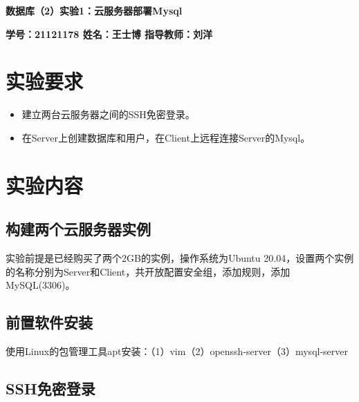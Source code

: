 \documentclass{article}
\begin{document}
 \pingfang
\begin{center}
    \textbf{\huge 数据库（2）实验1：云服务器部署Mysql}
\end{center}
\begin{center}
    \textbf{\large \textbf{学号：21121178 \quad 姓名：王士博 \quad 指导教师：刘洋}}
\end{center}
\hrulefill
\section{实验要求}
\begin{itemize}
  \item 建立两台云服务器之间的SSH免密登录。
  \item 在Server上创建数据库和用户，在Client上远程连接Server的Mysql。
\end{itemize}
\section{实验内容}
\subsection{构建两个云服务器实例}
实验前提是已经购买了两个2GB的实例，操作系统为Ubuntu 20.04，设置两个实例的名称分别为Server和Client，共开放配置安全组，添加规则，添加MySQL(3306)。
\subsection{前置软件安装}
\indent 使用Linux的包管理工具apt安装：（1）vim（2）openssh-server（3）mysql-server
\subsection{SSH免密登录}
\end{document}
